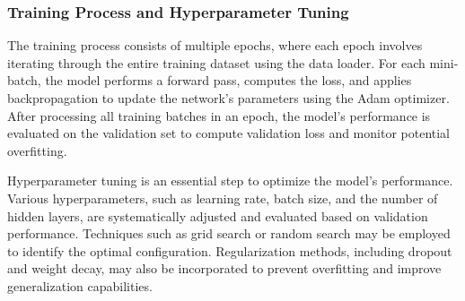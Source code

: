 \subsubsection{Training Process and Hyperparameter Tuning}

The training process consists of multiple epochs, where each epoch involves iterating through the entire training dataset using the data loader. For each mini-batch, the model performs a forward pass, computes the loss, and applies backpropagation to update the network’s parameters using the Adam optimizer. After processing all training batches in an epoch, the model’s performance is evaluated on the validation set to compute validation loss and monitor potential overfitting.

Hyperparameter tuning is an essential step to optimize the model’s performance. Various hyperparameters, such as learning rate, batch size, and the number of hidden layers, are systematically adjusted and evaluated based on validation performance. Techniques such as grid search or random search may be employed to identify the optimal configuration. Regularization methods, including dropout and weight decay, may also be incorporated to prevent overfitting and improve generalization capabilities.




